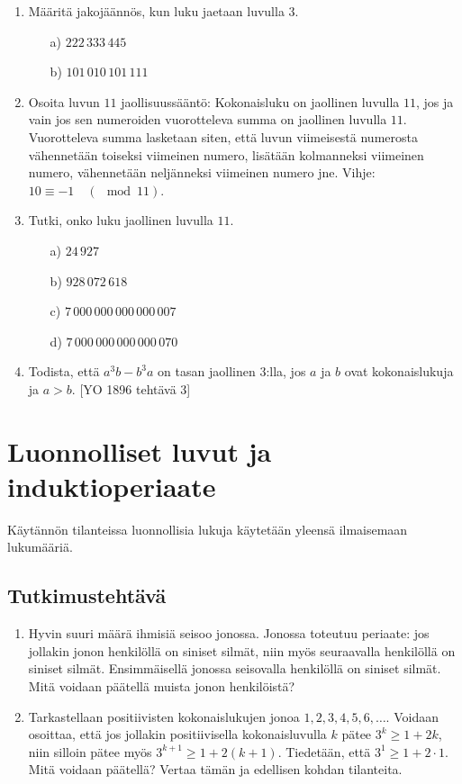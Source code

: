 \begin{enumerate}
\item
Määritä jakojäännös, kun luku jaetaan luvulla $3$.
\begin{itemize}
\item[a)] $222\, 333\, 445$
\item[b)] $101\, 010\, 101\, 111$
\end{itemize}

\item
Osoita luvun $11$ jaollisuussääntö: Kokonaisluku on jaollinen luvulla $11$, jos ja vain jos sen numeroiden vuorotteleva summa on jaollinen luvulla $11$. Vuorotteleva summa lasketaan siten, että luvun viimeisestä numerosta vähennetään toiseksi viimeinen numero, lisätään kolmanneksi viimeinen numero, vähennetään neljänneksi viimeinen numero jne. Vihje: $10\equiv -1\quad(\mod 11)$.

\item Tutki, onko luku jaollinen luvulla $11$.
\begin{itemize}
\item[a)] $24\, 927$
\item[b)] $928\, 072\, 618$
\item[c)] $7\, 000\, 000\, 000\, 000\, 007$
\item[d)] $7\, 000\, 000\, 000\, 000\, 070$
\end{itemize}

\item Todista, että $a^3b-b^3a$ on tasan jaollinen $3$:lla, jos $a$ ja $b$ ovat kokonaislukuja ja $a>b$. 
[YO 1896 tehtävä 3]

\end{enumerate}

\newpage

\section{Luonnolliset luvut ja induktioperiaate} %
Käytännön tilanteissa luonnollisia lukuja käytetään yleensä ilmaisemaan lukumääriä. 

\subsection*{Tutkimustehtävä}
\begin{enumerate}
\item
Hyvin suuri määrä ihmisiä seisoo jonossa. Jonossa toteutuu periaate: jos jollakin jonon
henkilöllä on siniset silmät, niin myös seuraavalla henkilöllä on siniset silmät. Ensimmäisellä jonossa seisovalla henkilöllä on siniset silmät. Mitä voidaan päätellä muista jonon henkilöistä?
\item
Tarkastellaan positiivisten kokonaislukujen jonoa $1, 2, 3, 4, 5, 6,\ldots$. Voidaan osoittaa, että jos jollakin positiivisella kokonaisluvulla $k$ pätee $3^k \ge 1+2k$, niin silloin pätee myös $3^{k+1} \ge 1+2(k+1)$. Tiedetään, että $3^1 \ge 1 + 2 \cdot 1$. Mitä voidaan päätellä? Vertaa tämän ja edellisen kohdan tilanteita.
\end{enumerate}

